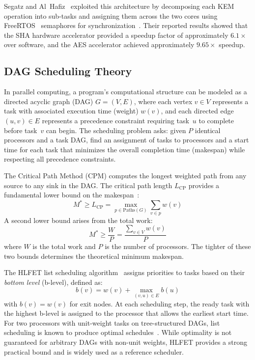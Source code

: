 \documentclass[journal]{IEEEtran}
\begin{document}
Segatz and Al~Hafiz~\cite{segatz2022} exploited this architecture by decomposing each KEM operation into sub-tasks and assigning them across the two cores using FreeRTOS~\cite{freertos} semaphores for synchronization~\cite{espfreertos}. Their reported results showed that the SHA hardware accelerator provided a speedup factor of approximately $6.1\times$ over software, and the AES accelerator achieved approximately $9.65\times$ speedup.

\subsection{DAG Scheduling Theory}

In parallel computing, a program's computational structure can be modeled as a directed acyclic graph (DAG) $G = (V, E)$, where each vertex $v \in V$ represents a task with associated execution time (weight) $w(v)$, and each directed edge $(u, v) \in E$ represents a precedence constraint requiring task~$u$ to complete before task~$v$ can begin. The scheduling problem asks: given $P$ identical processors and a task DAG, find an assignment of tasks to processors and a start time for each task that minimizes the overall completion time (makespan) while respecting all precedence constraints.

The Critical Path Method (CPM) computes the longest weighted path from any source to any sink in the DAG. The critical path length $L_{\mathrm{CP}}$ provides a fundamental lower bound on the makespan~\cite{graham1969}:
\begin{equation}
    M^{*} \geq L_{\mathrm{CP}} = \max_{p \in \mathrm{Paths}(G)} \sum_{v \in p} w(v)
    \label{eq:cp_bound}
\end{equation}
A second lower bound arises from the total work:
\begin{equation}
    M^{*} \geq \frac{W}{P} = \frac{\sum_{v \in V} w(v)}{P}
    \label{eq:work_bound}
\end{equation}
where $W$ is the total work and $P$ is the number of processors. The tighter of these two bounds determines the theoretical minimum makespan.

The HLFET list scheduling algorithm~\cite{kwok1999, adam1974} assigns priorities to tasks based on their \emph{bottom level} (b-level), defined as:
\begin{equation}
    b(v) = w(v) + \max_{(v,u) \in E} b(u)
    \label{eq:blevel}
\end{equation}
with $b(v) = w(v)$ for exit nodes. At each scheduling step, the ready task with the highest b-level is assigned to the processor that allows the earliest start time. For two processors with unit-weight tasks on tree-structured DAGs, list scheduling is known to produce optimal schedules~\cite{coffman1972}. While optimality is not guaranteed for arbitrary DAGs with non-unit weights, HLFET provides a strong practical bound and is widely used as a reference scheduler.
\end{document}
